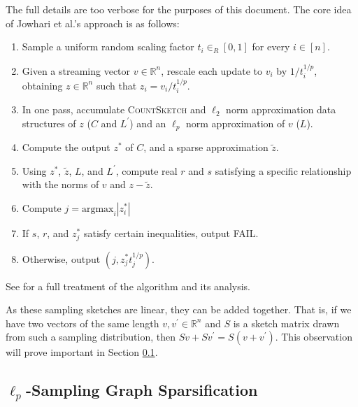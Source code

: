 \documentclass{report}
\newcommand{\algoname}[1]{\textnormal{\textsc{#1}}}
\newcommand{\argmax}{\mathrm{argmax}}
\begin{document}
The full details are too verbose for the purposes of this document.
The core idea of Jowhari et al.'s approach is as follows:
%
\begin{enumerate}
\item Sample a  uniform random scaling factor $t_i \in_R [0,1]$ for every $i \in [n]$.
\item Given a streaming vector $v \in \mathbb{R}^n$, rescale each update to $v_i$ by $1/t_i^{1/p}$, obtaining $z \in \mathbb{R}^n$ such that $z_i = v_i/t_i^{1/p}$.
\item In one pass, accumulate \algoname{CountSketch} and $\ell_2$ norm approximation data structures of $z$ ($C$ and $L^\prime$) and an $\ell_p$ norm approximation of $v$ ($L$). 
\item Compute the output $z^*$ of $C$, and a sparse approximation $\widetilde{z}$.
\item Using $z^*$, $\widetilde{z}$, $L$, and $L^\prime$, compute real $r$ and $s$ satisfying a specific relationship with the norms of $v$ and $z-\widetilde{z}$. 
\item Compute $j = \argmax_i |z_i^*|$
\item If $s$, $r$, and $z_j^*$ satisfy certain inequalities, output FAIL.
\item Otherwise, output $(j, z_j^*t_j^{1/p})$.
\end{enumerate}
%
See \cite{jowhari2011tight} for a full treatment of the algorithm and its analysis. 

As these sampling sketches are linear, they can be added together. 
That is, if we have two vectors of the same length $v, v^\prime \in \mathbb{R}^n$ and $S$ is a sketch matrix drawn from such a sampling distribution, then $Sv + Sv^\prime = S(v+v^\prime)$. 
This observation will prove important in Section \ref{sec:spanner}. 


\subsection{$\ell_p$-Sampling Graph Sparsification} \label{sec:spanner}
\end{document}
